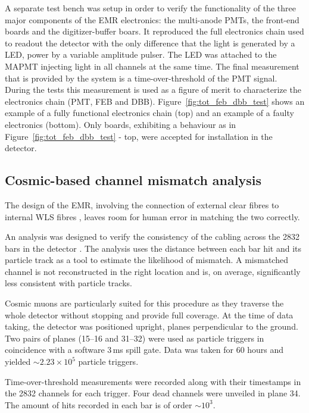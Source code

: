 \documentclass[a4paper,11pt]{article}
\begin{document}
A separate test bench was setup in order to verify the functionality of the three major components of the EMR electronics: the multi-anode PMTs, the 
front-end boards and the digitizer-buffer boars. It reproduced the full electronics chain used to readout the detector with the only difference that the
light is generated by a LED, power by a variable amplitude pulser. The LED was attached to the MAPMT injecting light in all channels at the same time. The
final measurement that is provided by the system is a time-over-threshold of the PMT signal. During the tests this measurement is used as a figure of merit
to characterize the electronics chain (PMT, FEB and DBB). Figure~\ref{fig:tot_feb_dbb_test} shows an example of a fully functional electronics chain (top)
and an example of a faulty electronics (bottom). Only boards, exhibiting a behaviour as in Figure~\ref{fig:tot_feb_dbb_test} - top, were accepted for
installation in the detector.

\subsection{Cosmic-based channel mismatch analysis}\label{sec:ch_mismatch}

The design of the EMR, involving the connection of external clear fibres to internal WLS fibres \cite{emr_design_change}, leaves room for human error in matching the two correctly.

An analysis was designed to verify the consistency of the cabling across the 2832 bars in the detector \cite{emr_xt, Francois}. The analysis uses the distance between each bar hit and its particle track as a tool to estimate the likelihood of mismatch. A mismatched channel is not reconstructed in the right location and is, on average, significantly less consistent with particle tracks.

Cosmic muons are particularly suited for this procedure as they traverse the whole detector without stopping and provide full coverage. At the time of data taking, the detector was positioned upright, planes perpendicular to the ground. Two pairs of planes (15--16 and 31--32) were used as particle triggers in coincidence with a software 3\,ms spill gate. Data was taken for 60 hours and yielded $\sim2.23\times10^5$ particle triggers.

Time-over-threshold measurements were recorded along with their timestamps in the 2832 channels for each trigger. Four dead channels were unveiled in plane 34. The amount of hits recorded in each bar is of order $\sim10^3$.
\end{document}
